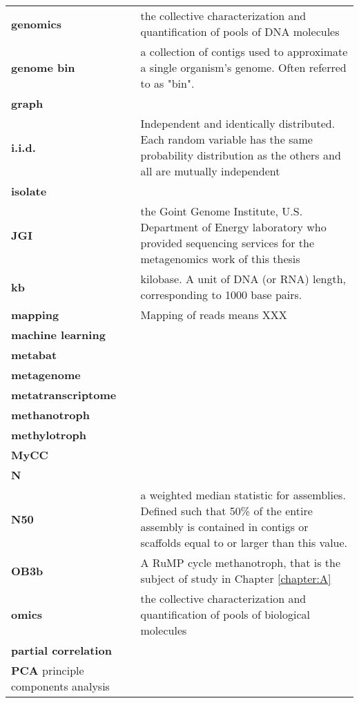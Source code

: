 \begin{singlespace}
\begin{longtable}{ p{}  p{} }
\textbf{genomics} & the collective characterization and quantification of pools of DNA molecules \\
\textbf{genome bin} & a collection of contigs used to approximate a single organism's genome.  Often referred to as "bin". \\
\textbf{graph} &  \\
\textbf{i.i.d.} & Independent and identically distributed.
    Each random variable has the same probability distribution as the others and all are mutually independent \\
\textbf{isolate} & \\
\textbf{JGI} & the Goint Genome Institute, U.S. Department of Energy laboratory who provided sequencing services for the metagenomics work of this thesis \\
\textbf{kb} & kilobase. A unit of DNA (or RNA) length, corresponding to 1000 base pairs. \\
\textbf{mapping} & Mapping of reads means XXX \\
\textbf{machine learning} &  \\
\textbf{metabat} &  \\
\textbf{metagenome} &  \\
\textbf{metatranscriptome} &  \\
\textbf{methanotroph} &  \\
\textbf{methylotroph} &  \\
\textbf{MyCC} &  \\
\textbf{N} &  \\
\textbf{N50} & a weighted median statistic for assemblies.  %
    Defined such that 50\% of the entire assembly is contained in contigs or scaffolds equal to or larger than this value. \\
\textbf{OB3b} & A RuMP cycle methanotroph, that is the subject of study in Chapter \ref{chapter:A}  \\
\textbf{omics} & the collective characterization and quantification of pools of biological molecules \\
\textbf{partial correlation} &  \\
\textbf{PCA} principle components analysis &  \\

\end{longtable}
\end{singlespace}
